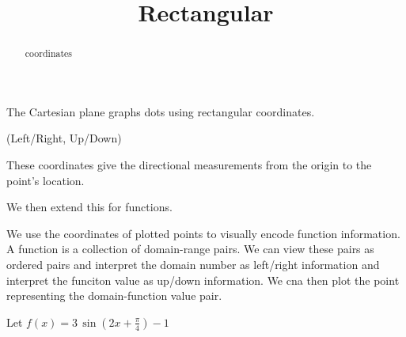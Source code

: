 \documentclass{ximera}
\title{Rectangular}
\begin{document}
\begin{abstract}
coordinates
\end{abstract}
\maketitle




The Cartesian plane graphs dots using rectangular coordinates.

\begin{center}
(Left/Right, Up/Down)
\end{center}

These coordinates give the directional measurements from the origin to the point's location.

We then extend this for functions.


We use the coordinates of plotted points to visually encode function information. A function is a collection of domain-range pairs. We can view these pairs as ordered pairs and interpret the domain number as left/right information and interpret the funciton value as up/down information.  We cna then plot the point representing the domain-function value pair.

Let $f(x) = 3 \, \sin(2x+\tfrac{\pi}{4}) - 1$

\begin{image}
\end{image}
\end{document}
